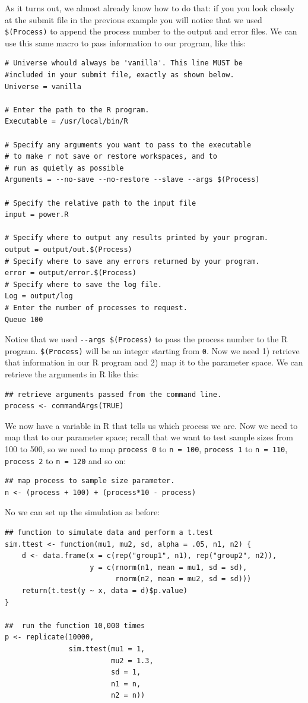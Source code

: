 \documentclass[11pt]{article}
\begin{document}
As it turns out, we almost already know how to do that: if you you look closely at the submit file in the previous example you will notice that we used \texttt{\$(Process)} to append the process number to the output and error files. We can use this same macro to pass information to our program, like this:
\begin{verbatim}
# Universe whould always be 'vanilla'. This line MUST be 
#included in your submit file, exactly as shown below.
Universe = vanilla

# Enter the path to the R program.
Executable = /usr/local/bin/R

# Specify any arguments you want to pass to the executable
# to make r not save or restore workspaces, and to 
# run as quietly as possible
Arguments = --no-save --no-restore --slave --args $(Process)

# Specify the relative path to the input file
input = power.R

# Specify where to output any results printed by your program.
output = output/out.$(Process)
# Specify where to save any errors returned by your program.
error = output/error.$(Process)
# Specify where to save the log file.
Log = output/log
# Enter the number of processes to request.
Queue 100
\end{verbatim}
Notice that we used \texttt{-{}-args \$(Process)} to pass the process number to the R program. \texttt{\$(Process)} will be an integer starting from \texttt{0}. Now we need 1) retrieve that information in our R program and 2) map it to the parameter space. We can retrieve the arguments in R like this:
\begin{verbatim}
## retrieve arguments passed from the command line.
process <- commandArgs(TRUE)
\end{verbatim}
We now have a variable in R that tells us which process we are. Now we need to map that to our parameter space; recall that we want to test sample sizes from 100 to 500, so we need to map \texttt{process 0} to \texttt{n = 100},  \texttt{process 1} to \texttt{n = 110}, \texttt{process 2} to \texttt{n = 120} and so on:
\begin{verbatim}
## map process to sample size parameter.
n <- (process + 100) + (process*10 - process)
\end{verbatim}

No we can set up the simulation as before:
\begin{verbatim}
## function to simulate data and perform a t.test
sim.ttest <- function(mu1, mu2, sd, alpha = .05, n1, n2) {
    d <- data.frame(x = c(rep("group1", n1), rep("group2", n2)),
                    y = c(rnorm(n1, mean = mu1, sd = sd),
                          rnorm(n2, mean = mu2, sd = sd)))
    return(t.test(y ~ x, data = d)$p.value)
}

##  run the function 10,000 times 
p <- replicate(10000,
               sim.ttest(mu1 = 1,
                         mu2 = 1.3,
                         sd = 1,
                         n1 = n,
                         n2 = n))
\end{verbatim}
\end{document}
